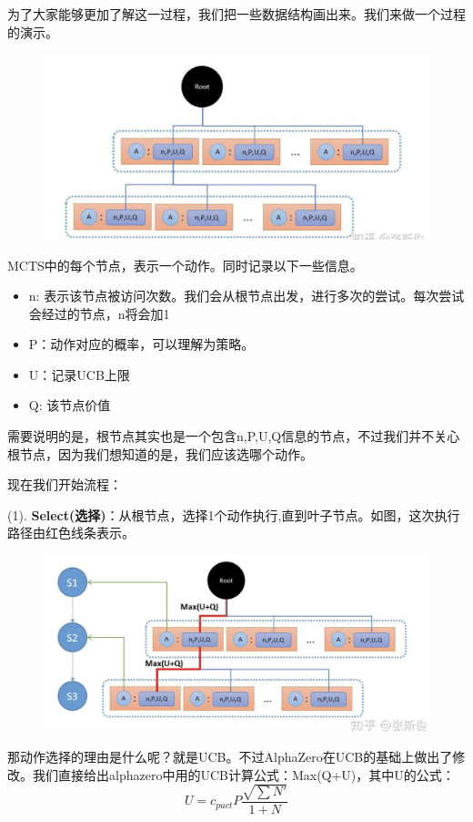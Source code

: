 \documentclass[12pt]{article}
\begin{document}
为了大家能够更加了解这一过程，我们把一些数据结构画出来。我们来做一个过程的演示。
\begin{figure}[H]
    \centering
    \includegraphics[width=.8\textwidth]{fig/ReinforcementLearning/AlphaZero_MCTS_1.png}
\end{figure}

MCTS中的每个节点，表示一个动作。同时记录以下一些信息。
\begin{itemize}
\setlength{\itemsep}{0pt}
\setlength{\parsep}{0pt}
\setlength{\parskip}{0pt}
    \item n: 表示该节点被访问次数。我们会从根节点出发，进行多次的尝试。每次尝试会经过的节点，n将会加1
    \item P：动作对应的概率，可以理解为策略。
    \item U：记录UCB上限
    \item Q: 该节点价值
\end{itemize}

需要说明的是，根节点其实也是一个包含n,P,U,Q信息的节点，不过我们并不关心根节点，因为我们想知道的是，我们应该选哪个动作。

现在我们开始流程：

(1). \textbf{Select(选择)}：从根节点，选择1个动作执行,直到叶子节点。如图，这次执行路径由红色线条表示。
\begin{figure}[H]
    \centering
    \includegraphics[width=.8\textwidth]{fig/ReinforcementLearning/AlphaZero_MCTS_2.png}
\end{figure}

那动作选择的理由是什么呢？就是UCB。不过AlphaZero在UCB的基础上做出了修改。我们直接给出alphazero中用的UCB计算公式：Max(Q+U)，其中U的公式：
$$
U = c_{puct}P\frac{\sqrt{\sum N'}}{1+N}
$$
\end{document}
